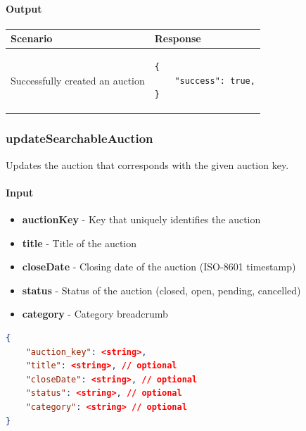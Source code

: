 \documentclass[12pt,a4paper]{article}
\begin{document}
\paragraph{Output}
\begin{center}
    \begin{tabular}{| p{7cm} | l |}
        \hline
        \textbf{Scenario} & \textbf{Response} \\
        \hline
        Successfully created an auction & 
        \begin{lstlisting}[language=tableJson,firstnumber=1]
{
    "success": true,
}

        \end{lstlisting} \\ 
        
        \hline
    \end{tabular}
\end{center}

\pagebreak
\subsubsection{updateSearchableAuction}
\label{ref:usa}
Updates the auction that corresponds with the given auction key.


\paragraph{Input}

\begin{itemize}
    \item \textbf{auctionKey} - Key that uniquely identifies the auction
    \item \textbf{title} - Title of the auction 
    \item \textbf{closeDate} - Closing date of the auction (ISO-8601 timestamp)
    \item \textbf{status} - Status of the auction (closed, open, pending, cancelled)
    \item \textbf{category} - Category breadcrumb
\end{itemize}
\begin{lstlisting}[language=json,numbers=none]
{
    "auction_key": <string>,
    "title": <string>, // optional
    "closeDate": <string>, // optional
    "status": <string>, // optional
    "category": <string> // optional
}
\end{lstlisting}
\end{document}

